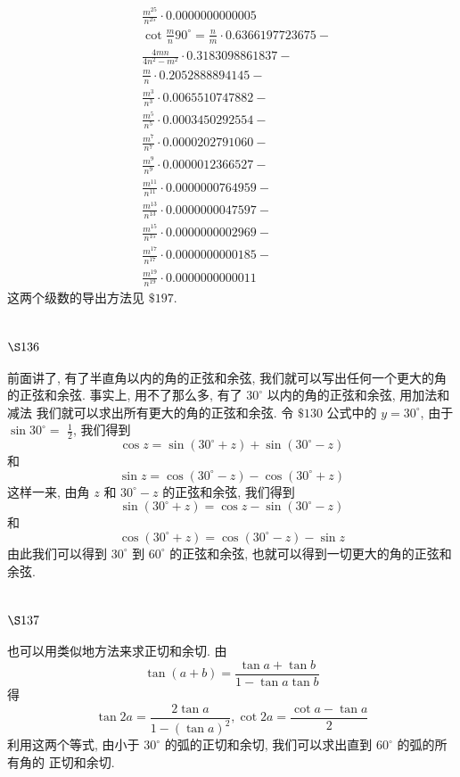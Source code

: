 \[
\begin{aligned}
& \frac{m^{25}}{n^{25}} \cdot 0.0000000000005 \\
& \cot \frac{m}{n} 90^{\circ}=\frac{n}{m} \cdot 0.6366197723675- \\
& \frac{4 m n}{4 n^{2}-m^{2}} \cdot 0.3183098861837- \\
& \frac{m}{n} \cdot 0.2052888894145- \\
& \frac{m^{3}}{n^{3}} \cdot 0.0065510747882- \\
& \frac{m^{5}}{n^{5}} \cdot 0.0003450292554- \\
& \frac{m^{7}}{n^{7}} \cdot 0.0000202791060- \\
& \frac{m^{9}}{n^{9}} \cdot 0.0000012366527- \\
& \frac{m^{11}}{n^{11}} \cdot 0.0000000764959- \\
& \frac{m^{13}}{n^{13}} \cdot 0.0000000047597- \\
& \frac{m^{15}}{n^{15}} \cdot 0.0000000002969- \\
& \frac{m^{17}}{n^{17}} \cdot 0.0000000000185- \\
& \frac{m^{19}}{n^{19}} \cdot 0.0000000000011
\end{aligned}
\]
这两个级数的导出方法见 $\$ 197$.

\section{$\S 136$}

前面讲了, 有了半直角以内的角的正弦和余弦, 我们就可以写出任何一个更大的角 的正弦和余弦. 事实上, 用不了那么多, 有了 $30^{\circ}$ 以内的角的正弦和余弦, 用加法和减法 我们就可以求出所有更大的角的正弦和余弦. 令 $\$ 130$ 公式中的 $y=30^{\circ}$, 由于 $\sin 30^{\circ}=$ $\frac{1}{2}$, 我们得到
\[
\cos z=\sin \left(30^{\circ}+z\right)+\sin \left(30^{\circ}-z\right)
\]
和
\[
\sin z=\cos \left(30^{\circ}-z\right)-\cos \left(30^{\circ}+z\right)
\]
这样一来, 由角 $z$ 和 $30^{\circ}-z$ 的正弦和余弦, 我们得到 
\[
\sin \left(30^{\circ}+z\right)=\cos z-\sin \left(30^{\circ}-z\right)
\]
和
\[
\cos \left(30^{\circ}+z\right)=\cos \left(30^{\circ}-z\right)-\sin z
\]
由此我们可以得到 $30^{\circ}$ 到 $60^{\circ}$ 的正弦和余弦, 也就可以得到一切更大的角的正弦和余弦.

\section{$\S 137$}

也可以用类似地方法来求正切和余切. 由
\[
\tan (a+b)=\frac{\tan a+\tan b}{1-\tan a \tan b}
\]
得
\[
\tan 2 a=\frac{2 \tan a}{1-(\tan a)^{2}}, \cot 2 a=\frac{\cot a-\tan a}{2}
\]
利用这两个等式, 由小于 $30^{\circ}$ 的弧的正切和余切, 我们可以求出直到 $60^{\circ}$ 的弧的所有角的 正切和余切.

